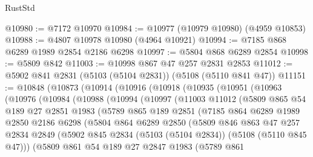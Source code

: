 \begin{lexlean}{RustStd}
\begin{coremodule}
@10980 := @7172 @10970
@10984 := @10977 (@10979 @10980) (@4959 @10853)
@10988 := @4807 @10978 @10980 (@4964 @10921)
@10994 := @7185 @868 @6289 @1989 @2854 @2186 @6298
@10997 := @5804 @868 @6289 @2854
@10998 := @5809 @842
@11003 := @10998 @867 @47 @257 @2831 @2853
@11012 := @5902 @841 @2831 (@5103 (@5104 @2831)) (@5108 (@5110 @841 @47))
@11151 := @10848
    (@10873
      (@10914
        (@10916
          (@10918
            (@10935
              (@10951
                (@10963
                  (@10976
                    (@10984
                      (@10988
                        (@10994
                          (@10997
                            (@11003
                              @11012
                              (@5809
                                @865
                                @54
                                @189
                                @27
                                @2851
                                @1983
                                (@5789
                                  @865
                                  @189
                                  @2851
                                  (@7185
                                    @864
                                    @6289
                                    @1989
                                    @2850
                                    @2186
                                    @6298
                                    (@5804
                                      @864
                                      @6289
                                      @2850
                                      (@5809
                                        @846
                                        @863
                                        @47
                                        @257
                                        @2834
                                        @2849
                                        (@5902
                                          @845
                                          @2834
                                          (@5103 (@5104 @2834))
                                          (@5108 (@5110 @845 @47)))
                                        (@5809
                                          @861
                                          @54
                                          @189
                                          @27
                                          @2847
                                          @1983
                                          (@5789
                                            @861

\end{coremodule}
\end{lexlean}
